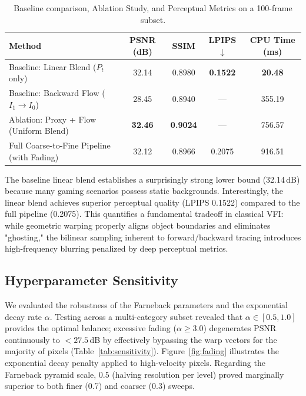 \documentclass{article}
\begin{document}
\begin{table}[h]
    \centering
    \caption{Baseline comparison, Ablation Study, and Perceptual Metrics on a 100-frame subset.}
    \label{tab:ablation}
    \small
    \begin{tabular}{@{}lcccc@{}}
    \toprule
    \textbf{Method} & \textbf{PSNR (dB)} & \textbf{SSIM} & \textbf{LPIPS} $\downarrow$ & \textbf{CPU Time (ms)} \\
    \midrule
    Baseline: Linear Blend ($P_t$ only) & 32.14 & 0.8980 & \textbf{0.1522} & \textbf{20.48} \\
    Baseline: Backward Flow ($I_1 \to I_0$) & 28.45 & 0.8940 & --- & 355.19 \\
    \midrule
    Ablation: Proxy + Flow (Uniform Blend) & \textbf{32.46} & \textbf{0.9024} & --- & 756.57 \\
    Full Coarse-to-Fine Pipeline (with Fading) & 32.12 & 0.8966 & 0.2075 & 916.51 \\
    \bottomrule
    \end{tabular}
\end{table}

The baseline linear blend establishes a surprisingly strong lower bound (32.14\,dB) because many gaming scenarios possess static backgrounds. Interestingly, the linear blend achieves superior perceptual quality (LPIPS 0.1522) compared to the full pipeline (0.2075). This quantifies a fundamental tradeoff in classical VFI: while geometric warping properly aligns object boundaries and eliminates "ghosting," the bilinear sampling inherent to forward/backward tracing introduces high-frequency blurring penalized by deep perceptual metrics.

\subsection{Hyperparameter Sensitivity}

We evaluated the robustness of the Farneback parameters and the exponential decay rate $\alpha$. Testing across a multi-category subset revealed that $\alpha \in [0.5, 1.0]$ provides the optimal balance; excessive fading ($\alpha \ge 3.0$) degenerates PSNR continuously to $<27.5$\,dB by effectively bypassing the warp vectors for the majority of pixels (Table~\ref{tab:sensitivity}). Figure~\ref{fig:fading} illustrates the exponential decay penalty applied to high-velocity pixels. Regarding the Farneback pyramid scale, $0.5$ (halving resolution per level) proved marginally superior to both finer (0.7) and coarser (0.3) sweeps.
\end{document}
